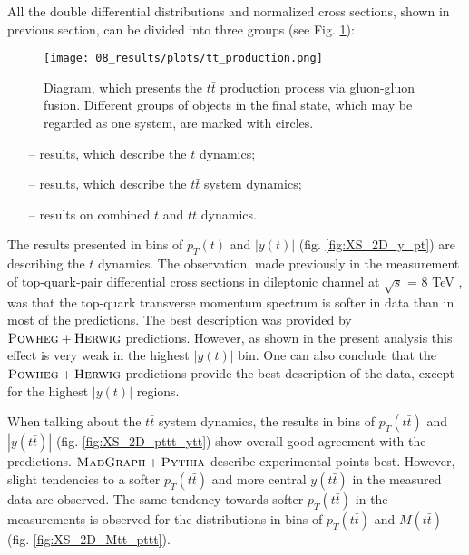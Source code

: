 All the double differential distributions and normalized cross sections, shown in previous section, can be divided into three groups (see Fig. \ref{fig:res_dynamics}):

\begin{figure}[H]
  \centering
  \texttt{[image: 08\_results/plots/tt\_production.png]}
  \caption{Diagram, which presents the $t\bar{t}$ production process via gluon-gluon fusion. Different groups of objects in the final state, which may be regarded
           as one system, are marked with circles.}
  \label{fig:res_dynamics}
\end{figure}

\begin{itemize}
 \item [--] results, which describe the $t$ dynamics;
 \item [--] results, which describe the $t\bar{t}$ system dynamics;
 \item [--] results on combined $t$  and $t\bar{t}$ dynamics.
\end{itemize}

The results presented in bins of $p_{T}(t)$ and $|y(t)|$ (fig. \ref{fig:XS_2D_y_pt}) are describing the $t$
dynamics. The observation, made previously in the measurement of top-quark-pair differential cross sections in dileptonic channel at 
$\sqrt{s}$ = 8 TeV \cite{Asin2014Auth}, was that the top-quark transverse momentum spectrum is softer in data than in most of the predictions. The best
description was provided by $\textsc{Powheg}+\textsc{Herwig}$ predictions. However, as shown in the present analysis this effect is very weak in the highest $|y(t)|$ bin. 
One can also conclude that the $\textsc{Powheg}+\textsc{Herwig}$ predictions provide the best description of the data, except for the highest $|y(t)|$ regions.

When talking about the $t\bar{t}$ system dynamics, the results in bins of $p_{T}(t\bar{t})$ and $|y(t\bar{t})|$ (fig. \ref{fig:XS_2D_pttt_ytt})
show overall good agreement with the predictions. $\textsc{MadGraph}+\textsc{Pythia}$ describe experimental points best. However, slight tendencies to a softer $p_{T}(t\bar{t})$
and more central $y(t\bar{t})$ in the measured data are observed. The same tendency towards softer $p_{T}(t\bar{t})$ in the measurements is observed for the distributions 
in bins of $p_{T}(t\bar{t})$ and $M(t\bar{t})$ (fig. \ref{fig:XS_2D_Mtt_pttt}).

